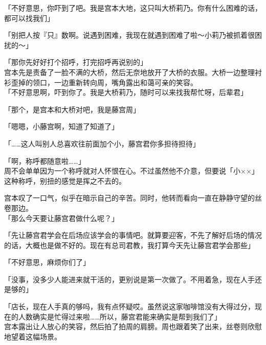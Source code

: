 「不好意思，你吓到了吧。我是宫本大地，这只叫大桥莉乃。你有什么困难的话，都可以找我们」

「别把人按『只』数啊。说遇到困难，我现在就遇到困难了啦～小莉乃被抓着很困扰的～」

「那你先好好打个招呼，打完招呼再说别的」\\

宫本先是责备了一脸不满的大桥，然后无奈地放开了大桥的衣服。大桥一边整理衬衫歪掉的领口，一边重新转向周，嘴角露出和蔼可亲的笑容。\\

「不好意思啊，吓到你了。我是大桥莉乃，随时可以来找我帮忙呀，后辈君」

「那个，是宫本和大桥对吧，我是藤宫周」

「嗯嗯，小藤宫啊，知道了知道了」

「……这人叫别人总喜欢往前面加个小，藤宫君你多担待担待」

「啊，称呼都随意啦……」\\

周不会单单因为一个称呼就对人怀恨在心。不过虽然他不介意，但要说「小××」这种称呼，别扭的感觉是挥之不去的。

宫本叹了一口气，似乎在暗示自己的辛苦。同时，他转而看向一直在静静守望的丝卷那边。\\

「那么今天要让藤宫君做什么呢？」

「先让藤宫君学会在后场应该学会的事情吧。就算要迎客，不先了解好后场的情况的话，大概也是做不好的。现在有总司君教，我打算今天先让藤宫君学会那些」

「不好意思，麻烦你们了」

「没事，没多少人能进来就干活的，更别说是第一次做了。不用着急，现在人手还是够的」

「店长，现在人手真的够吗，我有点怀疑哎。虽然说这家咖啡馆没有大得过分，现在的人数确实是忙得过来啦……所以，藤宫君能来确实是帮到我们了」\\

宫本露出让人放心的笑容，然后拍了拍周的肩膀。周也跟着笑了出来，丝卷则欣慰地望着这幅场景。
